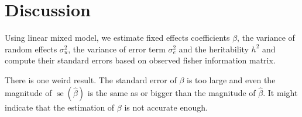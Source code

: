 \documentclass{article}
\newcommand{\se}[1]{\operatorname{se}(#1)}
\begin{document}
\section{Discussion}
Using linear mixed model, we estimate fixed effects coefficients $ \beta $, the variance of random effects $ \sigma^{2}_{u} $, the variance of error term $ \sigma^{2}_{e} $ and the heritability $ h^{2} $ and compute their standard errors based on observed fisher information matrix.

There is one weird result. The standard error of $ \beta $ is too large and even the magnitude of $ \se{\hat{\beta}} $ is the same as or bigger than the magnitude of $ \hat{\beta} $. It might indicate that the estimation of $ \beta $ is not accurate enough.
\end{document}
